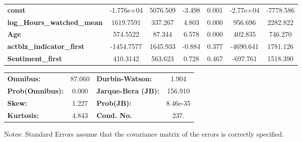 \documentclass{report}
\begin{document}
\begin{center}
\begin{tabular}{lcccccc}
\midrule
\textbf{const}                     &   -1.776e+04  &     5076.509     &    -3.498  &         0.001        &    -2.77e+04    &    -7778.586     \\
\textbf{log\_Hours\_watched\_mean} &    1619.7591  &      337.267     &     4.803  &         0.000        &      956.696    &     2282.822     \\
\textbf{Age}                       &     574.5522  &       87.344     &     6.578  &         0.000        &      402.835    &      746.270     \\
\textbf{actblz\_indicator\_first}  &   -1454.7577  &     1645.933     &    -0.884  &         0.377        &    -4690.641    &     1781.126     \\
\textbf{Sentiment\_first}          &     410.3142  &      563.623     &     0.728  &         0.467        &     -697.761    &     1518.390     \\
\bottomrule
\end{tabular}
\begin{tabular}{lclc}
\textbf{Omnibus:}       & 87.060 & \textbf{  Durbin-Watson:     } &    1.904  \\
\textbf{Prob(Omnibus):} &  0.000 & \textbf{  Jarque-Bera (JB):  } &  156.910  \\
\textbf{Skew:}          &  1.227 & \textbf{  Prob(JB):          } & 8.46e-35  \\
\textbf{Kurtosis:}      &  4.843 & \textbf{  Cond. No.          } &     237.  \\
\bottomrule
\end{tabular}
\end{center}

Notes: \newline
 [1] Standard Errors assume that the covariance matrix of the errors is correctly specified.
\end{document}
